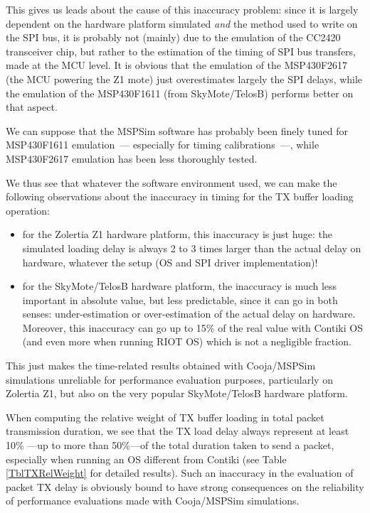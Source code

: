 \documentclass[10pt]{ewsn-proc}
\begin{document}
\medskip

This gives us leads about the cause of this inaccuracy problem: since it
is largely dependent on the hardware platform simulated \emph{and} the method
used to write on the SPI bus, it is probably not (mainly) due to the
emulation of the CC2420 transceiver chip, but rather to the estimation of
the timing of SPI bus transfers, made at the MCU level.
It is obvious that the emulation of the MSP430F2617 (the MCU powering the
Z1 mote) just overestimates largely the SPI delays, while the emulation
of the MSP430F1611 (from SkyMote/TelosB) performs better on that aspect.

We can suppose that the MSPSim software has probably been finely tuned for
MSP430F1611 emulation~--- especially for timing calibrations~---, while
MSP430F2617 emulation has been less thoroughly tested.

\medskip

We thus see that whatever the software environment used, we can make the
following observations about the inaccuracy in timing for the TX buffer
loading operation:
\begin{itemize}
\item for the Zolertia Z1 hardware platform, this inaccuracy is just huge:
the simulated loading delay is always 2 to 3 times larger than the actual
delay on hardware, whatever the setup (OS and SPI driver implementation)!
\item for the SkyMote/TelosB hardware platform, the inaccuracy is much less
important in absolute value, but less predictable, since it can go in both
senses: under-estimation or over-estimation of the actual delay on hardware.
Moreover, this inaccuracy can go up to 15\% of the real value with Contiki
OS (and even more when running RIOT OS) which is not a negligible fraction.
\end{itemize}

\bigskip

This just makes the time-related results obtained with Cooja/MSPSim
simulations unreliable for performance evaluation purposes, particularly
on Zolertia Z1, but also on the very popular SkyMote/TelosB hardware platform.

\medskip

When computing the relative weight of TX buffer loading in total packet
transmission duration, we see that the TX load delay always represent at
least 10\% ---up to more than 50\%---of the total duration taken to send
a packet, especially when running an OS different from Contiki (see Table
\ref{TblTXRelWeight} for detailed results).
Such an inaccuracy in the evaluation of packet TX delay is obviously bound
to have strong consequences on the reliability of performance evaluations
made with Cooja/MSPSim simulations.
\end{document}

